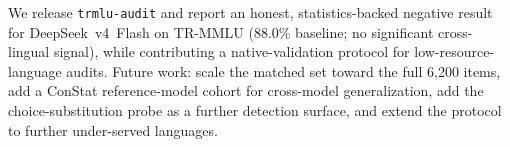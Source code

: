 \documentclass[11pt]{article}
\begin{document}
We release \texttt{trmlu-audit} and report an honest, statistics-backed negative result for DeepSeek~v4~Flash on TR-MMLU (88.0\% baseline; no significant cross-lingual signal), while contributing a native-validation protocol for low-resource-language audits. Future work: scale the matched set toward the full 6{,}200 items, add a ConStat reference-model cohort for cross-model generalization, add the choice-substitution probe \cite{yang2024data} as a further detection surface, and extend the protocol to further under-served languages.



\end{document}
